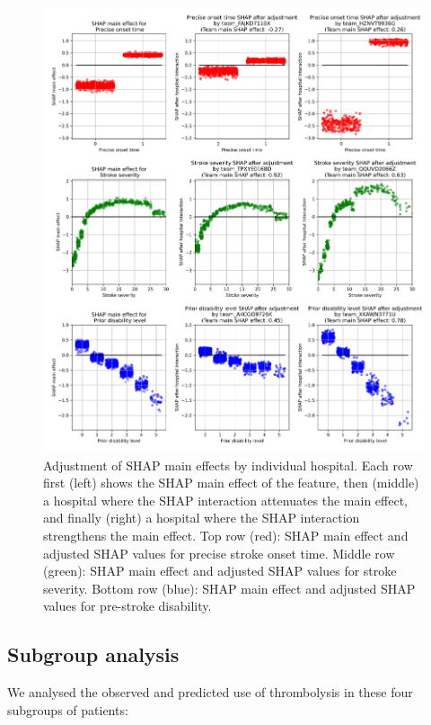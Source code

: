 \begin{itemize}
\begin{figure}
\centering
\includegraphics[width=1.0\textwidth]{./images/12aa_three_way_shap_adjustment}
\caption{Adjustment of SHAP main effects by individual hospital. Each row first (left) shows the SHAP main effect of the feature, then (middle) a hospital where the SHAP interaction attenuates the main effect, and finally (right) a hospital where the SHAP interaction strengthens the main effect. Top row (red): SHAP main effect and adjusted SHAP values for precise stroke onset time. Middle row (green): SHAP main effect and adjusted SHAP values for stroke severity. Bottom row (blue): SHAP main effect and adjusted SHAP values for pre-stroke disability.}
\label{fig:results_shap_hosp_intercations}
\end{figure}


\subsection{Subgroup analysis}

We analysed the observed and predicted use of thrombolysis in these four subgroups of patients:


\end{itemize}

